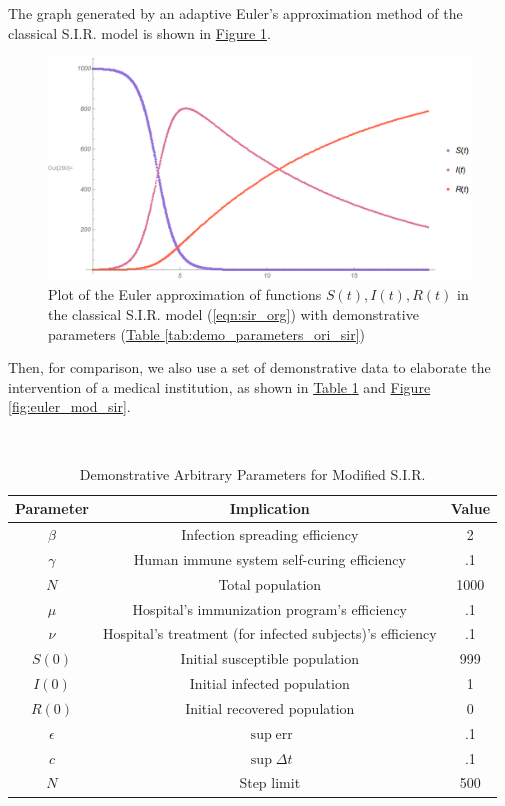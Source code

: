 \documentclass{article}
\newcommand{\MRef}[2]{\hyperref[#2]{#1 \ref*{#2}}}
\begin{document}
The graph generated by an adaptive Euler's approximation method of the classical S.I.R. model is shown in \MRef{Figure}{fig:euler_ori_sir}.

\begin{figure}[htbp]
\centering
\includegraphics[scale=.45, clip, trim=37.5pt 0 0 0]{AdaptiveEulerOriginalSIR.pdf}
        \caption{Plot of the Euler approximation of functions $S(t), I(t), R(t)$ in the classical S.I.R. model (\ref{eqn:sir_org}) with demonstrative parameters (\MRef{Table}{tab:demo_parameters_ori_sir})}
        \label{fig:euler_ori_sir}
\end{figure}
\newpage
Then, for comparison, we also use a set of demonstrative data to elaborate the intervention of a medical institution, as shown in  \hyperref[tab:demo_parameters_mod_sir]{Table \ref*{tab:demo_parameters_mod_sir}} and \hyperref[fig:euler_mod_sir]{Figure \ref*{fig:euler_mod_sir}}.

\begin{table}[htbp]
    \centering
    \caption{Demonstrative Arbitrary Parameters for Modified S.I.R.}\\[4pt]
    \label{tab:demo_parameters_mod_sir}
    \begin{tabular}{c|c|c}
         Parameter & Implication & Value \\\hline
         $\beta$ & Infection spreading efficiency & 2 \\
         $\gamma$ & Human immune system self-curing efficiency & .1 \\
         $N$ & Total population & 1000 \\\hline
         $\mu$ & Hospital's immunization program's efficiency & .1 \\
         $\nu$ & Hospital's treatment (for infected subjects)'s efficiency & .1 \\\hline
         $S(0)$ & Initial susceptible population & 999 \\
         $I(0)$ & Initial infected population & 1 \\
         $R(0)$ & Initial recovered population & 0 \\\hline
         $\epsilon$ & $\sup\mathrm{err}$ & .1 \\
         $c$ & $\sup\Delta t$ & .1 \\
         $N$ & Step limit & 500 \\
    \end{tabular}
\end{table}
\end{document}
